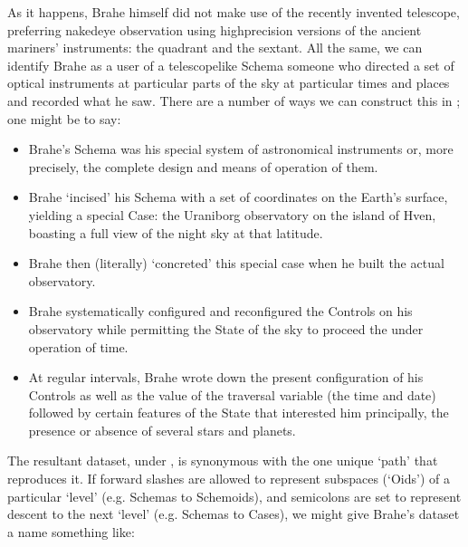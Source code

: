 \documentclass[letterpaper,10pt,english]{jupyterBook}
\begin{document}
\sphinxAtStartPar
As it happens, Brahe himself did not make use of the recently invented telescope, preferring naked\sphinxhyphen{}eye observation using high\sphinxhyphen{}precision versions of the ancient mariners’ instruments: the quadrant and the sextant. All the same, we can identify Brahe as a user of a telescope\sphinxhyphen{}like Schema \sphinxhyphen{} someone who directed a set of optical instruments at particular parts of the sky at particular times and places and recorded what he saw. There are a number of ways we can construct this in ; one might be to say:
\begin{itemize}
\item {} 
\sphinxAtStartPar
Brahe’s Schema was his special system of astronomical instruments \sphinxhyphen{} or, more precisely, the complete design and means of operation of them.

\item {} 
\sphinxAtStartPar
Brahe ‘incised’ his Schema with a set of coordinates on the Earth’s surface, yielding a special Case: the Uraniborg observatory on the island of Hven, boasting a full view of the night sky at that latitude.

\item {} 
\sphinxAtStartPar
Brahe then (literally) ‘concreted’ this special case when he built the actual observatory.

\item {} 
\sphinxAtStartPar
Brahe systematically configured and reconfigured the Controls on his observatory while permitting the State of the sky to proceed the under operation of time.

\item {} 
\sphinxAtStartPar
At regular intervals, Brahe wrote down the present configuration of his Controls as well as the value of the traversal variable (the time and date) followed by certain features of the State that interested him \sphinxhyphen{} principally, the presence or absence of several stars and planets.

\end{itemize}

\sphinxAtStartPar
The resultant dataset, under , is synonymous with the one unique ‘path’ that reproduces it. If forward slashes are allowed to represent sub\sphinxhyphen{}spaces (‘Oids’) of a particular ‘level’ (e.g. Schemas to Schemoids), and semicolons are set to represent descent to the next ‘level’ (e.g. Schemas to Cases), we might give Brahe’s dataset a name something like:
\end{document}
